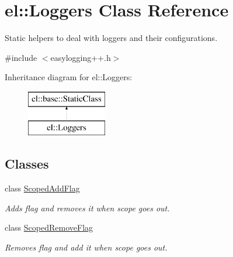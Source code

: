 \hypertarget{classel_1_1_loggers}{}\section{el\+:\+:Loggers Class Reference}
\label{classel_1_1_loggers}


Static helpers to deal with loggers and their configurations.  




{\ttfamily \#include $<$easylogging++.\+h$>$}

Inheritance diagram for el\+:\+:Loggers\+:\begin{figure}[H]
\begin{center}
\leavevmode
\includegraphics[height=2.000000cm]{classel_1_1_loggers}
\end{center}
\end{figure}
\subsection*{Classes}
\begin{DoxyCompactItemize}
\item 
class \hyperlink{classel_1_1_loggers_1_1_scoped_add_flag}{Scoped\+Add\+Flag}
\begin{DoxyCompactList}\small\item\em Adds flag and removes it when scope goes out. \end{DoxyCompactList}\item 
class \hyperlink{classel_1_1_loggers_1_1_scoped_remove_flag}{Scoped\+Remove\+Flag}
\begin{DoxyCompactList}\small\item\em Removes flag and add it when scope goes out. \end{DoxyCompactList}\end{DoxyCompactItemize}
